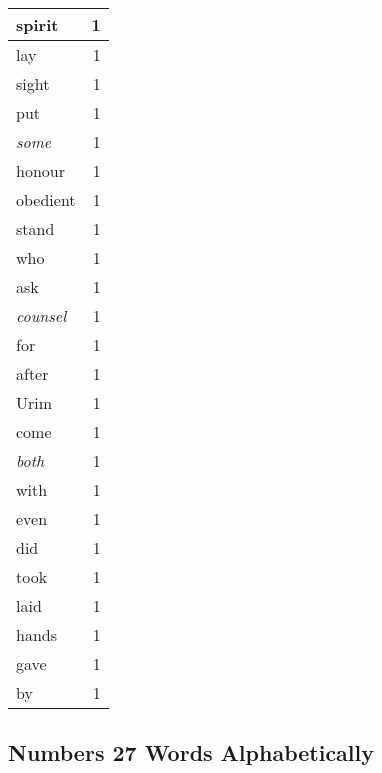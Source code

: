 \begin{center}
\begin{longtable}{l|r}
spirit & 1\\ \hline 
lay & 1\\ \hline 
sight & 1\\ \hline 
put & 1\\ \hline 
\emph{some} & 1\\ \hline 
honour & 1\\ \hline 
obedient & 1\\ \hline 
stand & 1\\ \hline 
who & 1\\ \hline 
ask & 1\\ \hline 
\emph{counsel} & 1\\ \hline 
for & 1\\ \hline 
after & 1\\ \hline 
Urim & 1\\ \hline 
come & 1\\ \hline 
\emph{both} & 1\\ \hline 
with & 1\\ \hline 
even & 1\\ \hline 
did & 1\\ \hline 
took & 1\\ \hline 
laid & 1\\ \hline 
hands & 1\\ \hline 
gave & 1\\ \hline 
by & 1\\ \hline 
\end{longtable}
\end{center}





\subsection{Numbers 27 Words Alphabetically}


\normalsize
 
